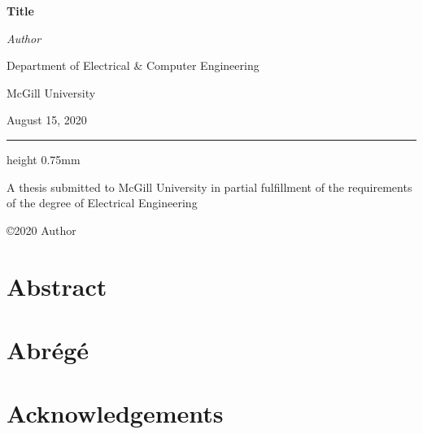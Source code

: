 \documentclass[12pt, TexShade, letterpaper]{report}
\author{\textcopyright Author, August, 2020}
\date{}
\renewcommand{\chaptermark}[1]{\markboth{#1}{}} %
\begin{document}
\begin{titlepage}
		\begin{center}
			\vspace*{0.5cm}

			\LARGE
			\textbf{Title}
			
			\vspace{1cm}
			
			\textit{Author}
			
			\vspace{7cm}
			
			
			\Large
			Department of Electrical \& Computer Engineering
			
			\vspace{-5mm}
			McGill University
			
			
			\vspace{5mm}
			August 15, 2020
			\small
			\vspace{0.5cm}
			{\color{red} \hrule height 0.75mm}
			
			\vspace{0.3cm}
			A thesis submitted to McGill University in partial fulfillment of the requirements of the degree of Electrical Engineering
			
			\copyright\hspace{0.5mm}2020 Author
			
		\end{center}
	\end{titlepage}
\setlength{\voffset}{2cm}
\renewcommand{\chaptermark}[1]{%
	\markboth{\thechapter.\ #1}{}}
\chapter*{Abstract}
	\label{chap:engAbstract}

\chapter*{Abrégé}
	\label{chap:frAbstract}

\chapter*{Acknowledgements}
	\label{chap:acknowledgments}
	
\end{document}
